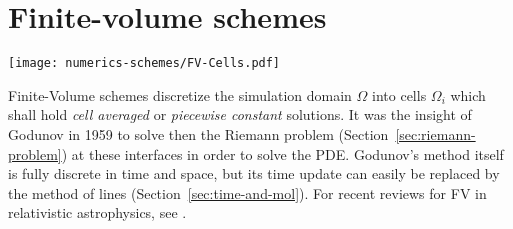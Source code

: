 
\section{Finite-volume schemes}\label{sec:fv}
\begin{marginfigure}[2cm]
\texttt{[image: numerics-schemes/FV-Cells.pdf]}
\caption[
   Cartoon of a Finite Volume description, drawn with Inkscape, \exclusive
  ]%
  {Finite volume simulation domain and termiology in an exemplaric simple
   two-dimensional Cartesian grid with rectangular cells. Shown are the cell
   barycenters, the cell corners, a domain boundary, the fluxes/waves which
   are described by the Riemann problem for a single highlighted
   demonstrator cell.
}
\end{marginfigure}

Finite-Volume schemes discretize the simulation domain $\Omega$
into cells $\Omega_i$ which shall hold \emph{cell averaged} or
\emph{piecewise constant} solutions. It was the insight of Godunov
in 1959 \cite{Godunov59} to solve then the Riemann problem (Section~\ref{sec:riemann-problem})
at these interfaces in order to solve the PDE. Godunov's method itself is
fully discrete in time and space, but its time update can easily be replaced
by the method of lines (Section~\ref{sec:time-and-mol}).
For recent reviews for FV in relativistic astrophysics, see \cite{Font08,Marti03}.


